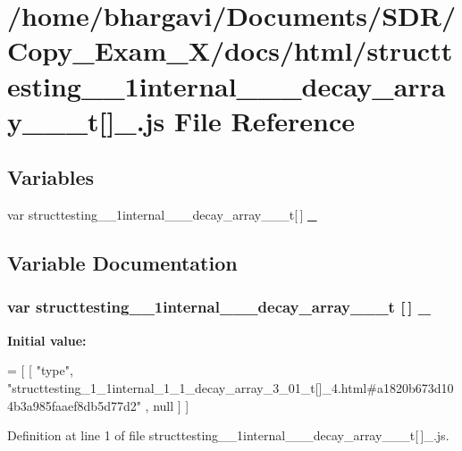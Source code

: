 \hypertarget{structtesting__1__1internal__1__1__decay__array__3__01__t[]__4_8js}{}\section{/home/bhargavi/\+Documents/\+S\+D\+R/\+Copy\+\_\+\+Exam\+\_\+X/docs/html/structtesting\+\_\+\_\+1internal\+\_\+\_\+\_\+decay\+\_\+array\+\_\+\_\+\_\+t\mbox{[}\mbox{]}\+\_.\+js File Reference}
\label{structtesting__1__1internal__1__1__decay__array__3__01__t[]__4_8js}
\subsection*{Variables}
\begin{DoxyCompactItemize}
\item 
var structtesting\+\_\+\_\+1internal\+\_\+\_\+\_\+decay\+\_\+array\+\_\+\_\+\_\+t\mbox{[}$\,$\mbox{]} \hyperlink{structtesting__1__1internal__1__1__decay__array__3__01__t[]__4_8js_afbc63f3c2939f45d356e3166f44dd7d4}{\+\_}
\end{DoxyCompactItemize}


\subsection{Variable Documentation}
\subsubsection[{\texorpdfstring{\+\_\+4}{_4}}]{\setlength{\rightskip}{0pt plus 5cm}var structtesting\+\_\+\_\+1internal\+\_\+\_\+\_\+decay\+\_\+array\+\_\+\_\+\_\+t \mbox{[}$\,$\mbox{]} \+\_}\hypertarget{structtesting__1__1internal__1__1__decay__array__3__01__t[]__4_8js_afbc63f3c2939f45d356e3166f44dd7d4}{}\label{structtesting__1__1internal__1__1__decay__array__3__01__t[]__4_8js_afbc63f3c2939f45d356e3166f44dd7d4}
{\bfseries Initial value\+:}
\begin{DoxyCode}
=
[
    [ \textcolor{stringliteral}{"type"}, \textcolor{stringliteral}{"structtesting\_1\_1internal\_1\_1\_decay\_array\_3\_01\_t[]\_4.html#a1820b673d104b3a985faaef8db5d77d2"}
      , null ]
]
\end{DoxyCode}


Definition at line 1 of file structtesting\+\_\+\_\+1internal\+\_\+\_\+\_\+decay\+\_\+array\+\_\+\_\+\_\+t\mbox{[}$\,$\mbox{]}\+\_.\+js.

